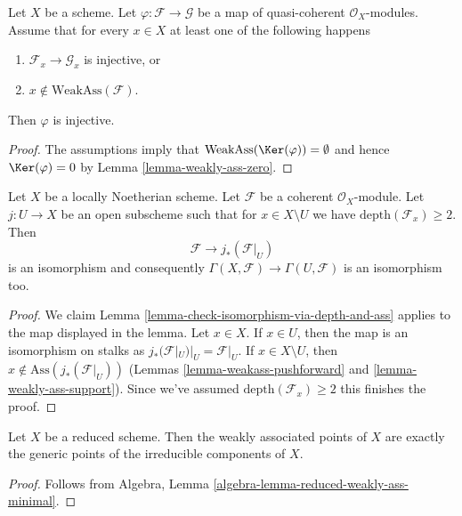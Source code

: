 \begin{lemma}
\label{lemma-check-injective-on-weakass}
Let $X$ be a scheme. Let $\varphi : \mathcal{F} \to \mathcal{G}$ be a map of
quasi-coherent $\mathcal{O}_X$-modules. Assume that for every $x \in X$
at least one of the following happens
\begin{enumerate}
\item $\mathcal{F}_x \to \mathcal{G}_x$ is injective, or
\item $x \not \in \text{WeakAss}(\mathcal{F})$.
\end{enumerate}
Then $\varphi$ is injective.
\end{lemma}

\begin{proof}
The assumptions imply that $\text{WeakAss}(\Ker(\varphi)) = \emptyset$
and hence $\Ker(\varphi) = 0$ by Lemma \ref{lemma-weakly-ass-zero}.
\end{proof}

\begin{lemma}
\label{lemma-depth-2-hartog}
Let $X$ be a locally Noetherian scheme. Let $\mathcal{F}$
be a coherent $\mathcal{O}_X$-module. Let $j : U \to X$
be an open subscheme such that for $x \in X \setminus U$
we have $\text{depth}(\mathcal{F}_x) \geq 2$. Then
$$
\mathcal{F} \longrightarrow j_*(\mathcal{F}|_U)
$$
is an isomorphism and consequently
$\Gamma(X, \mathcal{F}) \to \Gamma(U, \mathcal{F})$
is an isomorphism too.
\end{lemma}

\begin{proof}
We claim Lemma \ref{lemma-check-isomorphism-via-depth-and-ass}
applies to the map displayed in the lemma.
Let $x \in X$. If $x \in U$, then the map is an
isomorphism on stalks as $j_*(\mathcal{F}|_U)|_U = \mathcal{F}|_U$.
If $x \in X \setminus U$, then $x \not \in \text{Ass}(j_*(\mathcal{F}|_U))$
(Lemmas \ref{lemma-weakass-pushforward} and \ref{lemma-weakly-ass-support}).
Since we've assumed $\text{depth}(\mathcal{F}_x) \geq 2$
this finishes the proof.
\end{proof}

\begin{lemma}
\label{lemma-weakass-reduced}
Let $X$ be a reduced scheme. Then the weakly associated points of $X$
are exactly the generic points of the irreducible components of $X$.
\end{lemma}

\begin{proof}
Follows from Algebra, Lemma \ref{algebra-lemma-reduced-weakly-ass-minimal}.
\end{proof}



